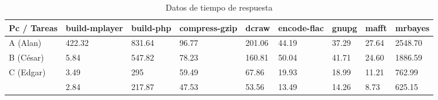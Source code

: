 \documentclass{article}
\begin{document}
\begin{enumerate}
{\begin{itemize}
{                    \begin{table}[]
                        \caption*{Datos de tiempo de respuesta}
                        \begin{tabular}{|l|l|l|l|l|l|l|l|l|}
						\toprule
						Pc / Tareas & \cellcolor[HTML]{DAE8FC}build-mplayer & \cellcolor[HTML]{DAE8FC}build-php & \cellcolor[HTML]{DAE8FC}compress-gzip & \cellcolor[HTML]{DAE8FC}dcraw  & \cellcolor[HTML]{DAE8FC}encode-flac & \cellcolor[HTML]{DAE8FC}gnupg & \cellcolor[HTML]{DAE8FC}mafft & \cellcolor[HTML]{DAE8FC}mrbayes  \\ \hline
						\cellcolor[HTML]{F8A102}{\color[HTML]{000000}} A (Alan)    & 422.32        & 831.64    & 96.77         & 201.06 & 44.19       & 37.29 & 27.64 & 2548.70  \\ \hline
						\cellcolor[HTML]{FFFE65}{\color[HTML]{000000}}B (César)   & 5.84             & 547.82         & 78.23             & 160.81      & 50.04           & 41.71     & 24.60     & 1886.59        \\ \hline
						\cellcolor[HTML]{34FF34}{\color[HTML]{000000}}C (Edgar)   & 3.49          & 295       & 59.49         & 67.86  & 19.93       & 18.99 & 11.21 & 762.99   \\ \hline
						\cellcolor[HTML]{9698ED}{\color[HTML]{000000} D(Sandra)}  & 2.84          & 217.87    & 47.53         & 53.56  & 13.49       & 14.26 & 8.73  & 625.15   \\ \hline
\end{tabular}
                    \end{table}
                }
                
                
                

\end{itemize}}
\end{enumerate}
\end{document}
